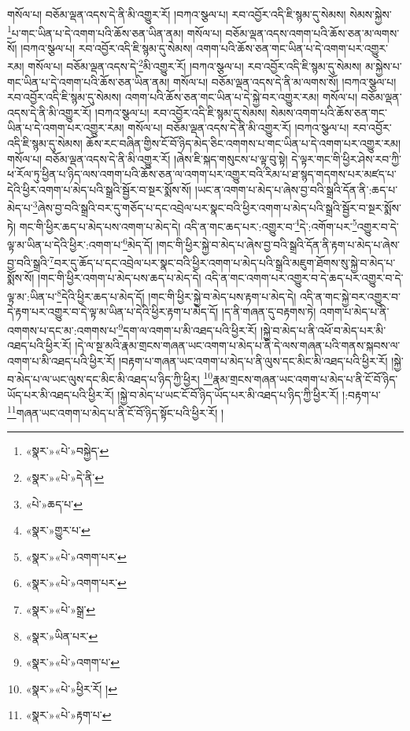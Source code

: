 གསོལ་པ། བཅོམ་ལྡན་འདས་དེ་ནི་མི་འགྱུར་རོ། །བཀའ་སྩལ་པ། རབ་འབྱོར་འདི་ཇི་སྙམ་དུ་སེམས། སེམས་སྐྱེས་\footnote{«སྣར་»«པེ་»བསྐྱེད་}པ་གང་ཡིན་པ་དེ་འགག་པའི་ཆོས་ཅན་ཡིན་ནམ། གསོལ་པ། བཅོམ་ལྡན་འདས་འགག་པའི་ཆོས་ཅན་མ་ལགས་སོ། །བཀའ་སྩལ་པ། རབ་འབྱོར་འདི་ཇི་སྙམ་དུ་སེམས། འགག་པའི་ཆོས་ཅན་གང་ཡིན་པ་དེ་འགག་པར་འགྱུར་རམ། གསོལ་པ། བཅོམ་ལྡན་འདས་དེ་\footnote{«སྣར་»«པེ་»དེ་ནི་}མི་འགྱུར་རོ། །བཀའ་སྩལ་པ། རབ་འབྱོར་འདི་ཇི་སྙམ་དུ་སེམས། མ་སྐྱེས་པ་གང་ཡིན་པ་དེ་འགག་པའི་ཆོས་ཅན་ཡིན་ནམ། གསོལ་པ། བཅོམ་ལྡན་འདས་དེ་ནི་མ་ལགས་སོ། །བཀའ་སྩལ་པ། རབ་འབྱོར་འདི་ཇི་སྙམ་དུ་སེམས། འགག་པའི་ཆོས་ཅན་གང་ཡིན་པ་དེ་སྐྱེ་བར་འགྱུར་རམ། གསོལ་པ། བཅོམ་ལྡན་འདས་དེ་ནི་མི་འགྱུར་རོ། །བཀའ་སྩལ་པ། རབ་འབྱོར་འདི་ཇི་སྙམ་དུ་སེམས། སེམས་འགག་པའི་ཆོས་ཅན་གང་ཡིན་པ་དེ་འགག་པར་འགྱུར་རམ། གསོལ་པ། བཅོམ་ལྡན་འདས་དེ་ནི་མི་འགྱུར་རོ། །བཀའ་སྩལ་པ། རབ་འབྱོར་འདི་ཇི་སྙམ་དུ་སེམས། ཆོས་རང་བཞིན་གྱིས་ངོ་བོ་ཉིད་མེད་ཅིང་འགགས་པ་གང་ཡིན་པ་དེ་འགག་པར་འགྱུར་རམ། གསོལ་པ། བཅོམ་ལྡན་འདས་དེ་ནི་མི་འགྱུར་རོ། །ཞེས་ཇི་སྐད་གསུངས་པ་ལྟ་བུ་སྟེ། དེ་ལྟར་གང་གི་ཕྱིར་ཤེས་རབ་ཀྱི་ཕ་རོལ་ཏུ་ཕྱིན་པ་ཉིད་ལས་འགག་པའི་ཆོས་ཅན་ལ་འགག་པར་འགྱུར་བའི་རིམ་པ་ཐ་སྙད་གདགས་པར་མཛད་པ་དེའི་ཕྱིར་འགག་པ་མེད་པའི་སྒྲའི་སྦྱོར་བ་སྔར་སྨོས་སོ། །ཡང་ན་འགག་པ་མེད་པ་ཞེས་བྱ་བའི་སྒྲའི་དོན་ནི་:ཆད་པ་མེད་པ་\footnote{«པེ་»ཆད་པ་}ཞེས་བྱ་བའི་སྒྲའི་བར་དུ་གཅོད་པ་དང་འབྲེལ་པར་སྣང་བའི་ཕྱིར་འགག་པ་མེད་པའི་སྒྲའི་སྦྱོར་བ་སྔར་སྨོས་ཏེ། གང་གི་ཕྱིར་ཆད་པ་མེད་པས་འགག་པ་མེད་དེ། འདི་ན་གང་ཆད་པར་:འགྱུར་བ་\footnote{«སྣར་»གྱུར་པ་}དེ་:འགོག་པར་\footnote{«སྣར་»«པེ་»འགག་པར་}འགྱུར་བ་དེ་ལྟ་མ་ཡིན་པ་དེའི་ཕྱིར་:འགག་པ་\footnote{«སྣར་»«པེ་»འགག་པར་}མེད་དོ། །གང་གི་ཕྱིར་སྐྱེ་བ་མེད་པ་ཞེས་བྱ་བའི་སྒྲའི་དོན་ནི་རྟག་པ་མེད་པ་ཞེས་བྱ་བའི་སྒྲའི་\footnote{«སྣར་»«པེ་»སྒྲ་}བར་དུ་ཆོད་པ་དང་འབྲེལ་པར་སྣང་བའི་ཕྱིར་འགག་པ་མེད་པའི་སྒྲའི་མཇུག་ཐོགས་སུ་སྐྱེ་བ་མེད་པ་སྨོས་སོ། །གང་གི་ཕྱིར་འགག་པ་མེད་པས་ཆད་པ་མེད་དེ། འདི་ན་གང་འགག་པར་འགྱུར་བ་དེ་ཆད་པར་འགྱུར་བ་དེ་ལྟ་མ་:ཡིན་པ་\footnote{«སྣར་»ཡིན་པར་}དེའི་ཕྱིར་ཆད་པ་མེད་དོ། །གང་གི་ཕྱིར་སྐྱེ་བ་མེད་པས་རྟག་པ་མེད་དེ། འདི་ན་གང་སྐྱེ་བར་འགྱུར་བ་དེ་རྟག་པར་འགྱུར་བ་དེ་ལྟ་མ་ཡིན་པ་དེའི་ཕྱིར་རྟག་པ་མེད་དོ། །ད་ནི་གཞན་དུ་བརྟགས་ཏེ། འགག་པ་མེད་པ་ནི་འགགས་པ་དང་མ་:འགགས་པ་\footnote{«སྣར་»«པེ་»འགག་པ་}དག་ལ་འགག་པ་མི་འཐད་པའི་ཕྱིར་རོ། །སྐྱེ་བ་མེད་པ་ནི་འཕོ་བ་མེད་པར་མི་འཐད་པའི་ཕྱིར་རོ། །དེ་ལ་སྔ་མའི་རྣམ་གྲངས་གཞན་ཡང་འགག་པ་མེད་པ་ནི་དེ་ལས་གཞན་པའི་གནས་སྐབས་ལ་འགག་པ་མི་འཐད་པའི་ཕྱིར་རོ། །བརྟག་པ་གཞན་ཡང་འགག་པ་མེད་པ་ནི་ལུས་དང་མིང་མི་འཐད་པའི་ཕྱིར་རོ། །སྐྱེ་བ་མེད་པ་ལ་ཡང་ལུས་དང་མིང་མི་འཐད་པ་ཉིད་ཀྱི་ཕྱིར། \footnote{«སྣར་»«པེ་»ཕྱིར་རོ། ། }རྣམ་གྲངས་གཞན་ཡང་འགག་པ་མེད་པ་ནི་ངོ་བོ་ཉིད་ཡོད་པར་མི་འཐད་པའི་ཕྱིར་རོ། །སྐྱེ་བ་མེད་པ་ཡང་ངོ་བོ་ཉིད་ཡོད་པར་མི་འཐད་པ་ཉིད་ཀྱི་ཕྱིར་རོ། །:བརྟག་པ་\footnote{«སྣར་»«པེ་»རྟག་པ་}གཞན་ཡང་འགག་པ་མེད་པ་ནི་ངོ་བོ་ཉིད་སྟོང་པའི་ཕྱིར་རོ། །
